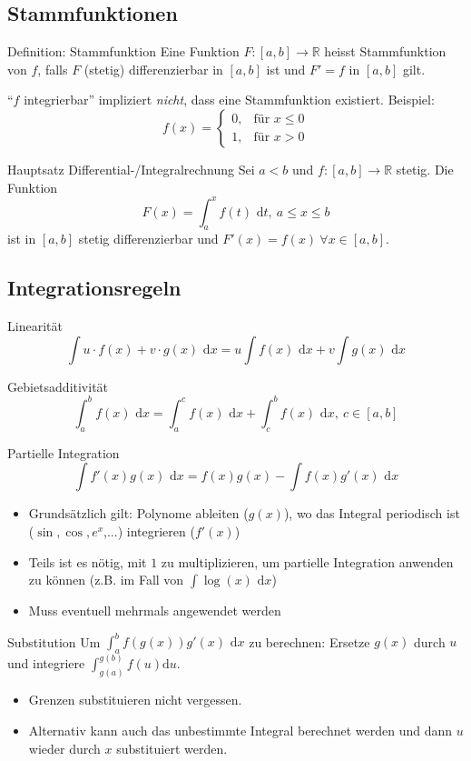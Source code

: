 \documentclass[a4paper,10pt]{article}
\def\R{\mathbb{R}}
\def\dx{\text{ d}x}
\begin{document}
\subsection{Stammfunktionen}
\begin{subbox}{Definition: Stammfunktion}
 Eine Funktion $F: [a,b] \to \R$ heisst Stammfunktion von $f$, falls $F$ (stetig) differenzierbar in $[a,b]$ ist und $F' = f$ in $[a,b]$ gilt.
\end{subbox}
``$f$ integrierbar'' impliziert \textit{nicht}, dass eine Stammfunktion existiert. Beispiel:
$$
 f(x) = \begin{cases}
        0, & \text{für } x \le 0 \\
        1, & \text{für } x > 0
        \end{cases}
$$

\begin{mainbox}{Hauptsatz Differential-/Integralrechnung}
 Sei $a<b$ und $f: [a,b] \to \R$ stetig. Die Funktion 
 $$F(x) = \int_a^x f(t) \text{ d}t, \ a \le x \le b$$
 ist in $[a,b]$ stetig differenzierbar und $F'(x) = f(x) \ \forall x \in [a,b]$.
\end{mainbox}

\subsection{Integrationsregeln}
\begin{subbox}{Linearität}
 \vspace{-12pt}
 $$\int u\cdot f(x) + v \cdot g(x) \dx = u \int f(x) \dx + v \int g(x) \dx$$
\end{subbox}
\begin{subbox}{Gebietsadditivität}
 \vspace{-12pt}
 $$\int_a^b f(x) \dx = \int_a^c f(x) \dx + \int_c^b f(x) \dx, \ c \in [a,b]$$
\end{subbox}
\begin{mainbox}{Partielle Integration}
 \vspace{-12pt}
 $$\int f'(x) g(x) \dx = f(x)g(x) - \int f(x) g'(x) \dx$$
\end{mainbox}
\begin{itemize}
 \item Grundsätzlich gilt: Polynome ableiten ($g(x)$), wo das Integral periodisch ist ($\sin, \cos, e^x$,...) integrieren ($f'(x)$)
 \item Teils ist es nötig, mit $1$ zu multiplizieren, um partielle Integration anwenden zu können (z.B. im Fall von $\int \log(x) \dx$)
 \item Muss eventuell mehrmals angewendet werden
\end{itemize}
\begin{mainbox}{Substitution}
 Um $\int_a^b f(g(x))g'(x) \dx$ zu berechnen: Ersetze $g(x)$ durch $u$ und integriere $\int_{g(a)}^{g(b)} f(u) \text{d}u$.
\end{mainbox}
\begin{itemize}
 \item Grenzen substituieren nicht vergessen.
 \item Alternativ kann auch das unbestimmte Integral berechnet werden und dann $u$ wieder durch $x$ substituiert werden.
\end{itemize}
\end{document}
